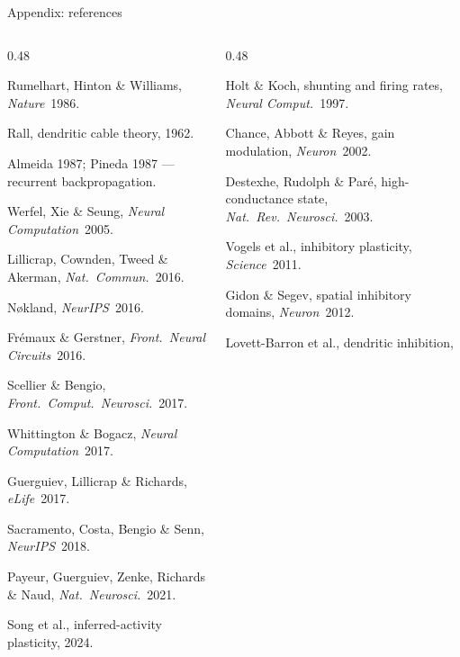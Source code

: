 \begin{frame}{Appendix: references}
  \vspace{0.05cm}
  \begin{columns}[T,onlytextwidth]
    \begin{column}{0.48\textwidth}
      {\color{Mute}\fontsize{7}{9}\selectfont\raggedright
       Rumelhart, Hinton \& Williams, \emph{Nature}~1986.\par
       Rall, dendritic cable theory, 1962.\par
       Almeida 1987; Pineda 1987 --- recurrent backpropagation.\par
       Werfel, Xie \& Seung, \emph{Neural Computation}~2005.\par
       Lillicrap, Cownden, Tweed \& Akerman, \emph{Nat.~Commun.}~2016.\par
       N\o kland, \emph{NeurIPS}~2016.\par
       Fr\'emaux \& Gerstner, \emph{Front.~Neural Circuits}~2016.\par
       Scellier \& Bengio, \emph{Front.~Comput.~Neurosci.}~2017.\par
       Whittington \& Bogacz, \emph{Neural Computation}~2017.\par
       Guerguiev, Lillicrap \& Richards, \emph{eLife}~2017.\par
       Sacramento, Costa, Bengio \& Senn, \emph{NeurIPS}~2018.\par
       Payeur, Guerguiev, Zenke, Richards \& Naud,
         \emph{Nat.~Neurosci.}~2021.\par
       Song et al., inferred-activity plasticity, 2024.\par}
    \end{column}
    \begin{column}{0.48\textwidth}
      {\color{Mute}\fontsize{7}{9}\selectfont\raggedright
       Holt \& Koch, shunting and firing rates, \emph{Neural Comput.}~1997.\par
       Chance, Abbott \& Reyes, gain modulation, \emph{Neuron}~2002.\par
       Destexhe, Rudolph \& Par\'e, high-conductance state,
         \emph{Nat.~Rev.~Neurosci.}~2003.\par
       Vogels et al., inhibitory plasticity, \emph{Science}~2011.\par
       Gidon \& Segev, spatial inhibitory domains, \emph{Neuron}~2012.\par
       Lovett-Barron et al., dendritic inhibition,
}
\end{column}
\end{columns}
\end{frame}
